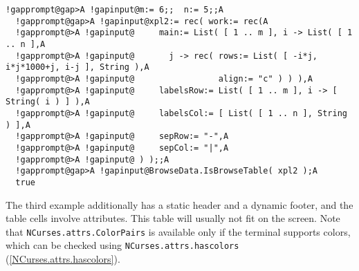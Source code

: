 \documentclass[a4paper,11pt]{report}
\begin{document}
{{{ 
\begin{Verbatim}[commandchars=!@A,fontsize=\small,frame=single,label=Example]
  !gapprompt@gap>A !gapinput@m:= 6;;  n:= 5;;A
  !gapprompt@gap>A !gapinput@xpl2:= rec( work:= rec(A
  !gapprompt@>A !gapinput@     main:= List( [ 1 .. m ], i -> List( [ 1 .. n ],A
  !gapprompt@>A !gapinput@       j -> rec( rows:= List( [ -i*j, i*j*1000+j, i-j ], String ),A
  !gapprompt@>A !gapinput@                 align:= "c" ) ) ),A
  !gapprompt@>A !gapinput@     labelsRow:= List( [ 1 .. m ], i -> [ String( i ) ] ),A
  !gapprompt@>A !gapinput@     labelsCol:= [ List( [ 1 .. n ], String ) ],A
  !gapprompt@>A !gapinput@     sepRow:= "-",A
  !gapprompt@>A !gapinput@     sepCol:= "|",A
  !gapprompt@>A !gapinput@ ) );;A
  !gapprompt@gap>A !gapinput@BrowseData.IsBrowseTable( xpl2 );A
  true
\end{Verbatim}
 

 The third example additionally has a static header and a dynamic footer, and
the table cells involve attributes. This table will usually not fit on the
screen. Note that \texttt{NCurses.attrs.ColorPairs} is available only if the terminal supports colors, which can be checked using \texttt{NCurses.attrs.has{\textunderscore}colors} (\ref{NCurses.attrs.hascolors}). 

}}}
\end{document}
